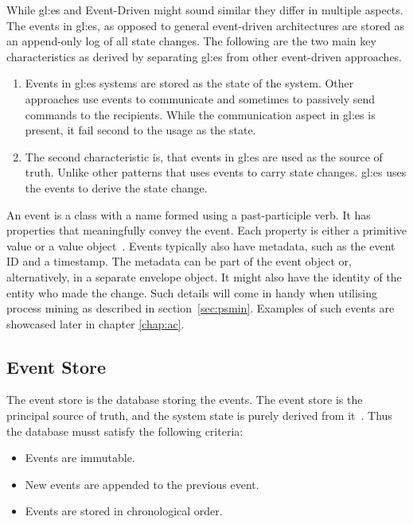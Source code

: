 While \gls{gl:es} and Event-Driven might sound similar they differ in multiple aspects. The events in \gls{gl:es}, as opposed to general event-driven architectures are stored as an append-only log of all state changes. The following are the two main key characteristics as derived by \citep{esvsed} separating \gls{gl:es} from other event-driven approaches.

\begin{enumerate}
  \item Events in \gls{gl:es} systems are stored as the state of the system. Other approaches use events to communicate and sometimes to passively send commands to the recipients. While the communication aspect in \gls{gl:es} is present, it fail second to the usage as the state.
  \item The second characteristic is, that events in \gls{gl:es} are used as the source of truth. Unlike other patterns that uses events to carry state changes. \Gls{gl:es} uses the events to derive the state change. 
\end{enumerate}

An event is a class with a name formed using a past-participle verb. It has properties that meaningfully convey the event. Each property is either a primitive value or a value object~\citep{richardson2018microservices}. Events typically also have metadata, such as the event ID and a timestamp. The metadata can be part of the event object or, alternatively, in a separate envelope object. It might also have the identity of the entity who made the change. Such details will come in handy when utilising process mining as described in section~\ref{sec:psmin}. Examples of such events are showcased later in chapter \ref{chap:ac}.

\subsection{Event Store}\label{subsec:est}

The event store is the database storing the events. The event store is the principal source of truth, and the system state is purely derived from it~\citep{esvsed}. Thus the database musst satisfy the following criteria:

\begin{itemize}
  \item Events are immutable.
  \item New events are appended to the previous event.
  \item Events are stored in chronological order.
\end{itemize}

